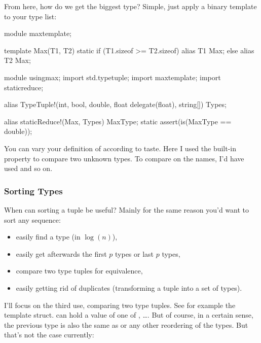 From here, how do we get the biggest type? Simple, just apply a  binary template to your type list:

\begin{dcode}
module maxtemplate;

template Max(T1, T2)
{
    static if (T1.sizeof >= T2.sizeof)
        alias T1 Max;
    else
        alias T2 Max;
}
\end{dcode}

\begin{dcode}
module usingmax;
import std.typetuple;
import maxtemplate;
import staticreduce;

alias TypeTuple!(int, bool, double, float delegate(float), string[]) Types;

alias staticReduce!(Max, Types) MaxType;
static assert(is(MaxType == double));
\end{dcode}

You can vary your definition of  according to taste. Here I used the built-in  property to compare two unknown types. To compare on the names, I'd have used  and so on.

\subsubsection{Sorting Types}\label{sortingtypes}


When can sorting a tuple be useful? Mainly for the same reason you'd want to sort any sequence:

\begin{itemize}
\item easily find a type (in $\log(n)$),
\item easily get afterwards the first $p$ types or last $p$ types,
\item compare two type tuples for equivalence,
\item easily getting rid of duplicates (transforming a tuple into a set of types).
\end{itemize}

I'll focus on the third use, comparing two type tuples. See for example the  template struct.  can hold a value of one of , \ldots {}. But of course, in a certain sense, the previous type is also the same as  or any other reordering of the types. But that's not the case currently:

